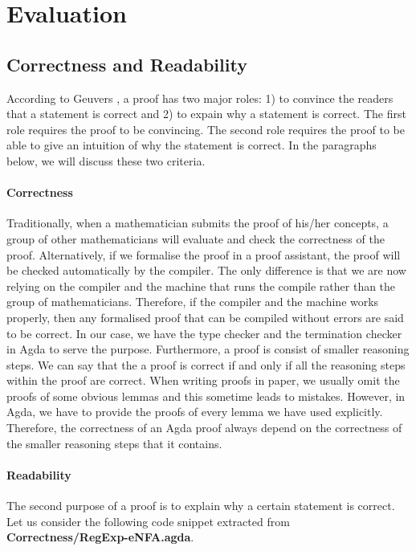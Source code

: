 \section{Evaluation}

\subsection{Correctness and Readability}
\par According to Geuvers \cite{geuvers2009}, a proof has two major roles: 1)
to convince the readers that a statement is correct and 2) to expain
why a statement is correct. The first role requires the proof to be
convincing. The second role requires the proof to be able to give an
intuition of why the statement is correct. In the paragraphs below, we
will discuss these two criteria. 

\paragraph{Correctness} Traditionally, when a mathematician submits
the proof of his/her concepts, a group of other mathematicians will
evaluate and check the correctness of the proof. Alternatively, if we
formalise the proof in a proof assistant, the proof will be checked
automatically by the compiler. The only difference is that we are now
relying on the compiler and the machine that runs the compile rather
than the group of mathematicians. Therefore, if the compiler and the
machine works properly, then any formalised proof that
can be compiled without errors are said to be correct. In our case, we
have the type checker and the termination checker in Agda to serve the
purpose. Furthermore, a proof is consist of smaller reasoning
steps. We can say that the a proof is correct if and only if all the
reasoning steps within the proof
are correct. When writing proofs in paper, we usually omit the proofs of
some obvious lemmas and this sometime leads to mistakes. However, in
Agda, we have to provide the proofs
of every lemma we have used explicitly. Therefore, the correctness of
an Agda proof always depend on the correctness of the smaller
reasoning steps that it contains. 

\paragraph{Readability} The second purpose of a proof is to explain why
a certain statement is correct. Let us consider the following code
snippet extracted from \textbf{Correctness/RegExp-eNFA.agda}. 

